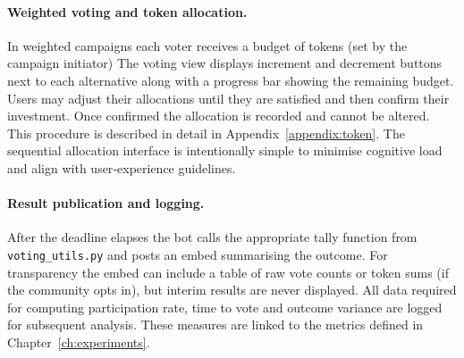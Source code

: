 \paragraph{Weighted voting and token allocation.}  In weighted
campaigns each voter receives a budget of tokens (set by the campaign initiator)  The voting view displays increment and decrement
buttons next to each alternative along with a progress bar showing the
remaining budget.  Users may adjust their allocations until they are
satisfied and then confirm their investment.  Once confirmed the
allocation is recorded and cannot be altered.  This procedure is
described in detail in Appendix~\ref{appendix:token}.  The sequential
allocation interface is intentionally simple to minimise cognitive load
and align with user‑experience guidelines.

\paragraph{Result publication and logging.}  After the deadline
elapses the bot calls the appropriate tally function from
\texttt{voting\_utils.py} and posts an embed summarising the outcome.
For transparency the embed can include a table of raw vote counts or
token sums (if the community opts in), but interim results are never
displayed.  All data required for computing participation rate, time to
vote and outcome variance are logged for subsequent analysis.  These
measures are linked to the metrics defined in Chapter~\ref{ch:experiments}.